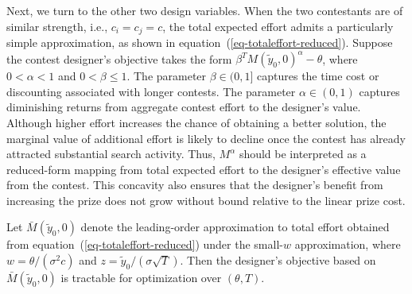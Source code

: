 \documentclass[mnsc]{informs3}
\begin{document}
Next, we turn to the other two design variables.
When the two contestants are of similar strength, i.e., $c_i = c_j = c$, the total expected effort admits a particularly simple approximation, as shown in equation~(\ref{eq-totaleffort-reduced}).
Suppose the contest designer's objective takes the form $\beta^{T}M(\tilde{y}_0,0)^\alpha-\theta$, where $0<\alpha<1$ and $0<\beta\leq 1$.
The parameter $\beta\in(0,1]$ captures the time cost or discounting associated
with longer contests.
The parameter $\alpha\in(0,1)$ captures diminishing returns from aggregate
contest effort to the designer's value.
Although higher effort increases the chance of obtaining a better solution, the marginal value of additional effort is likely to decline once the contest has already attracted substantial search
activity.
Thus, $M^\alpha$ should be interpreted as a reduced-form mapping from total expected effort to the designer's effective value from the contest.
This concavity also ensures that the designer's benefit from increasing the prize does not grow without bound relative to the linear prize cost.


Let $\bar{M}(\tilde y_0,0)$ denote the leading-order approximation to total effort obtained from equation~(\ref{eq-totaleffort-reduced}) under the small-$w$ approximation, where $w=\theta/(\sigma^2c)$ and $z=\tilde y_0/(\sigma\sqrt{T})$.
Then the designer's objective based on $\bar M(\tilde y_0,0)$ is tractable for optimization over $(\theta,T)$.
\end{document}
